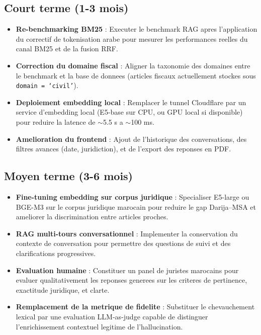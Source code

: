 \subsection{Court terme (1-3 mois)}

\begin{itemize}
    \item \textbf{Re-benchmarking BM25} : Executer le benchmark RAG apres l'application du correctif de tokenisation arabe pour mesurer les performances reelles du canal BM25 et de la fusion RRF.

    \item \textbf{Correction du domaine fiscal} : Aligner la taxonomie des domaines entre le benchmark et la base de donnees (articles fiscaux actuellement stockes sous \texttt{domain = `civil'}).

    \item \textbf{Deploiement embedding local} : Remplacer le tunnel Cloudflare par un service d'embedding local (E5-base sur CPU, ou GPU local si disponible) pour reduire la latence de $\sim$5.5 s a $\sim$100 ms.

    \item \textbf{Amelioration du frontend} : Ajout de l'historique des conversations, des filtres avances (date, juridiction), et de l'export des reponses en PDF.
\end{itemize}

\subsection{Moyen terme (3-6 mois)}

\begin{itemize}
    \item \textbf{Fine-tuning embedding sur corpus juridique} : Specialiser E5-large ou BGE-M3 sur le corpus juridique marocain pour reduire le gap Darija--MSA et ameliorer la discrimination entre articles proches.

    \item \textbf{RAG multi-tours conversationnel} : Implementer la conservation du contexte de conversation pour permettre des questions de suivi et des clarifications progressives.

    \item \textbf{Evaluation humaine} : Constituer un panel de juristes marocains pour evaluer qualitativement les reponses generees sur les criteres de pertinence, exactitude juridique, et clarte.

    \item \textbf{Remplacement de la metrique de fidelite} : Substituer le chevauchement lexical par une evaluation LLM-as-judge capable de distinguer l'enrichissement contextuel legitime de l'hallucination.
\end{itemize}

